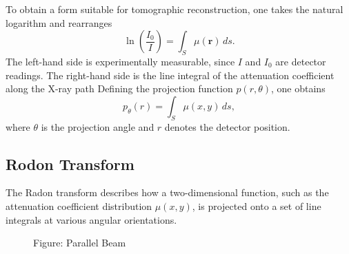 \documentclass[../../../main.tex]{subfiles}
\begin{document}
To obtain a form suitable for tomographic reconstruction, one takes the natural logarithm and rearranges
\begin{equation*}
    \ln\!\left(\frac{I_0}{I}\right) = \int_{S} \mu(\mathbf{r}) \, ds.
\end{equation*}
The left-hand side is experimentally measurable, since $I$ and $I_0$ are detector readings.
The right-hand side is the line integral of the attenuation coefficient along the X-ray path
Defining the projection function $p(r,\theta)$, one obtains
\begin{equation*}
    p_\theta(r)    = \int_{S} \mu(x,y) \, ds,
\end{equation*}
where $\theta$ is the projection angle and $r$ denotes the detector position.

\subsection{Rodon Transform}
The Radon transform describes how a two-dimensional function, such as the attenuation coefficient distribution $\mu(x,y)$, is projected onto a set of line integrals at various angular orientations.

\begin{figure*}
    \centering
    \caption*{Figure: Parallel Beam}
\end{figure*}
\end{document}
